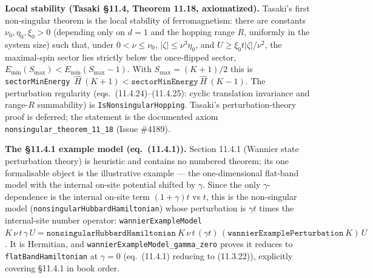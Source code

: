 \documentclass[a4paper,11pt]{article}
\begin{document}
\medskip\noindent\textbf{Local stability (Tasaki §11.4, Theorem 11.18, axiomatized).}  Tasaki's
first non-singular theorem is the local stability of ferromagnetism: there are constants
$\nu_0,\eta_0,\xi_0>0$ (depending only on $d=1$ and the hopping range $R$, uniformly in the
system size) such that, under $0<\nu\le\nu_0$, $|\zeta|\le\nu^3\eta_0$, and
$U\ge\xi_0 t|\zeta|/\nu^2$, the maximal-spin sector lies strictly below the once-flipped sector,
$E_{\min}(S_{\max})<E_{\min}(S_{\max}-1)$.  With $S_{\max}=(K{+}1)/2$ this is
\texttt{sectorMinEnergy}~$\hat H~(K{+}1)<\texttt{sectorMinEnergy}~\hat H~(K{-}1)$.  The
perturbation regularity (eqs.~(11.4.24)--(11.4.25): cyclic translation invariance and range-$R$
summability) is \texttt{IsNonsingularHopping}.  Tasaki's perturbation-theory proof is deferred;
the statement is the documented axiom \texttt{nonsingular\_theorem\_11\_18} (Issue \#4189).

\medskip\noindent\textbf{The §11.4.1 example model (eq.~(11.4.1)).}  Section 11.4.1 (Wannier
state perturbation theory) is heuristic and contains no numbered theorem; its one
formalisable object is the illustrative example --- the one-dimensional flat-band model with
the internal on-site potential shifted by $\gamma$.  Since the only $\gamma$-dependence is the
internal on-site term $(1{+}\gamma)t$ vs $t$, this is the non-singular model
(\texttt{nonsingularHubbardHamiltonian}) whose perturbation is $\gamma t$ times the
internal-site number operator: \texttt{wannierExampleModel}~$K\,\nu\,t\,\gamma\,U =
\texttt{nonsingularHubbardHamiltonian}~K\,\nu\,t\,(\gamma t)\,(\texttt{wannierExamplePerturbation}~K)\,U$.
It is Hermitian, and \texttt{wannierExampleModel\_gamma\_zero} proves it reduces to
\texttt{flatBandHamiltonian} at $\gamma=0$ (eq.~(11.4.1) reducing to (11.3.22)), explicitly
covering §11.4.1 in book order.
\end{document}
